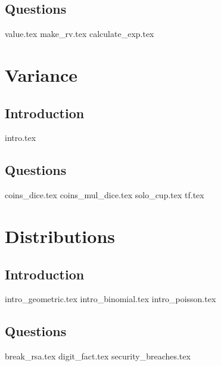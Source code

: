\documentclass{exam}
\begin{document}
\subsection{Questions}
\begin{questions}
{value.tex}
{make_rv.tex}
{calculate_exp.tex}
\end{questions}

\section{Variance}
\subsection{Introduction}
{intro.tex}
\subsection{Questions}
\begin{questions}
{coins_dice.tex}
{coins_mul_dice.tex}
{solo_cup.tex}
{tf.tex}
\end{questions}

\section{Distributions}
\subsection{Introduction}
{intro_geometric.tex}
{intro_binomial.tex}
{intro_poisson.tex}
\subsection{Questions}
\begin{questions}
{break_rsa.tex}
{digit_fact.tex}
{security_breaches.tex}
\end{questions}
\end{document}
